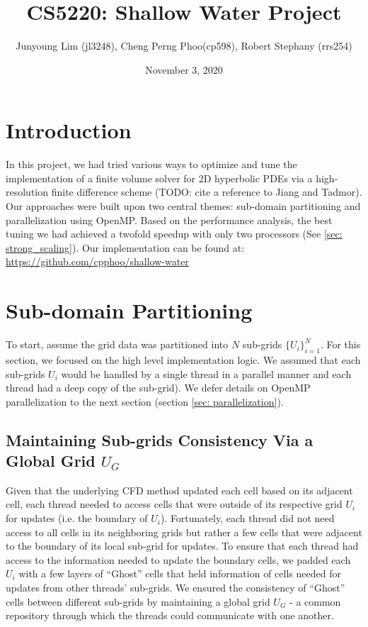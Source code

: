 \documentclass{article}
\title{CS5220: Shallow Water Project}
\author{Junyoung Lim (jl3248), Cheng Perng Phoo(cp598), Robert Stephany (rrs254)}
\date{November 3, 2020}
\begin{document}
\maketitle

\section{Introduction}

In this project, we had tried various ways to optimize and tune the implementation of a finite volume solver for 2D hyperbolic PDEs via a high-resolution finite difference scheme (TODO: cite a reference to Jiang and Tadmor). 
Our approaches were built upon two central themes: sub-domain partitioning and parallelization using OpenMP. 
Based on the performance analysis, the best tuning we had achieved a twofold speedup with only two processors (See \ref{sec: strong_scaling}). Our implementation can be found at: \url{https://github.com/cpphoo/shallow-water}

\section{Sub-domain Partitioning}
\label{sec: subdomain_partitioning}
To start, assume the grid data was partitioned into $N$ sub-grids $\{U_i\}_{i=1}^N$.
For this section, we focused on the high level implementation logic. We assumed 
that each sub-grids $U_i$ would be handled by a single thread in a parallel manner and 
each thread had a deep copy of the sub-grid). 
We defer details on OpenMP parallelization to the next section (section \ref{sec: parallelization}). 

\subsection{Maintaining Sub-grids Consistency Via a Global Grid $U_G$}

Given that the underlying CFD method updated each cell based on its adjacent cell, each thread needed to access cells that were outside of its respective grid $U_i$ for updates (i.e. the boundary of $U_i$). 
Fortunately, each thread did not need access to all cells in its neighboring grids but rather a few cells that were adjacent to the boundary of its local sub-grid for updates.
To ensure that each thread had access to the information needed to update the boundary cells, we padded each $U_i$ with a few layers of ``Ghost'' cells that held information of cells 
needed for updates from other threads' sub-grids. We ensured the consistency of ``Ghost'' cells between different sub-grids by maintaining a global grid $U_G$ - a common repository 
through which the threads could communicate with one another.
\end{document}
